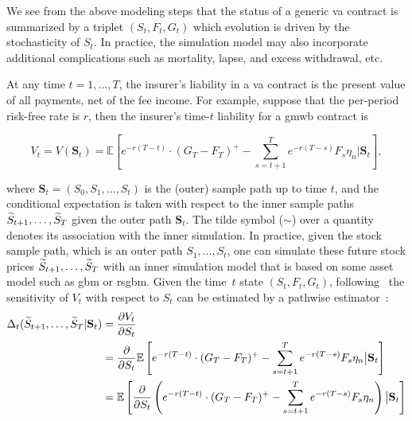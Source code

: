 We see from the above modeling steps that the status of a generic \gls{va} contract is summarized by a triplet $(S_t,F_t,G_t)$ which evolution is driven by the stochasticity of $S_t$.
In practice, the simulation model may also incorporate additional complications such as mortality, lapse, and excess withdrawal, etc.

At any time $t=1,\ldots,T$, the insurer's liability in a \gls{va} contract is the present value of all payments, net of the fee income.
For example, suppose that the per-period risk-free rate is $r$, then
the insurer's time-$t$ liability for a \gls{gmwb} contract is

\begin{equation} \label{eq2:liability-gmwb}
    V_t = V(\mathbf{S}_t) = \mathbb{E} \left[ e^{-r(T-t)}\cdot (G_T - F_T)^+ - \sum_{s=t+1}^{T} e^{-r(T-s)} F_s \eta_n \big\vert \mathbf{S}_t \right],
\end{equation}

where $\mathbf{S}_t = (S_0, S_1, \ldots, S_t)$ is the (outer) sample path up to time $t$, and the conditional expectation is taken with respect to the inner sample paths $\widetilde{S}_{t+1},\ldots,\widetilde{S}_{T}$ given the outer path $\mathbf{S}_t$.
The tilde symbol ($\sim$) over a quantity denotes its association with the inner simulation.
In practice, given the stock sample path, which is an outer path $S_1,\ldots,S_t$, one can simulate these future stock prices $\widetilde{S}_{t+1},\ldots,\widetilde{S}_{T}$ with an inner simulation model that is based on some asset model such as \gls{gbm} or \gls{rsgbm}.
Given the time~$t$ state $(S_t,F_t,G_t)$, following~\cite{cathcart2015calculating} the sensitivity of $V_t$ with respect to $S_t$ can be estimated by a pathwise estimator~\citep{glasserman2004monte}:
\begin{align}\label{eq2:delta}
    \Delta_t(\widetilde{S}_{t+1},\ldots,\widetilde{S}_{T} | \mathbf{S}_t) 
    & = \frac{\partial V_t}{\partial S_t} \nonumber \\
    & = \frac{\partial}{\partial S_t} \mathbb{E} \left[ e^{-r(T-t)}\cdot (G_T - F_T)^+ - \sum_{s=t+1}^{T} e^{-r(T-s)} F_s \eta_n \big\vert \mathbf{S}_t \right] \nonumber \\
    & = \mathbb{E} \left[ \frac{\partial}{\partial S_t} \left( e^{-r(T-t)}\cdot (G_T - F_T)^+ - \sum_{s=t+1}^{T} e^{-r(T-s)} F_s \eta_n \right) \big\vert \mathbf{S}_t \right] 
\end{align}

